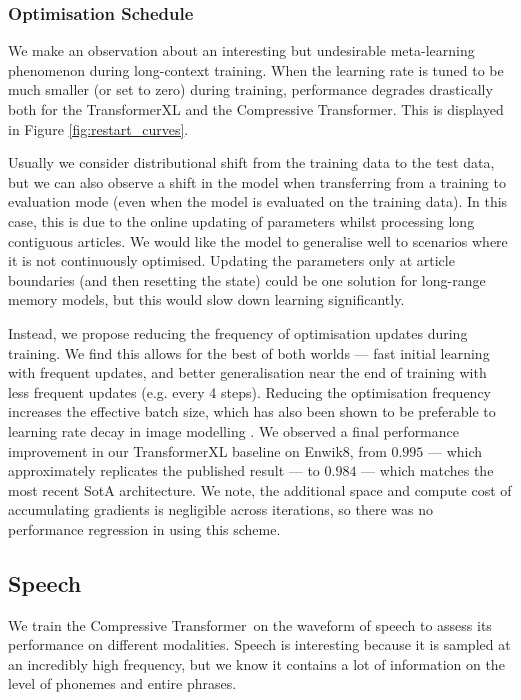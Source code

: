 \subsubsection{Optimisation Schedule}
\label{section:optimisation}
We make an observation about an interesting but undesirable meta-learning phenomenon during long-context training. When the learning rate is tuned to be much smaller (or set to zero) during training, performance degrades drastically both for the TransformerXL and the Compressive Transformer. This is displayed in Figure \ref{fig:restart_curves}.  

Usually we consider distributional shift from the training data to the test data, but we can also observe a shift in the model when transferring from a training to evaluation mode (even when the model is evaluated on the training data). In this case, this is due to the online updating of parameters whilst processing long contiguous articles. We would like the model to generalise well to scenarios where it is not continuously optimised. Updating the parameters only at article boundaries (and then resetting the state) could be one solution for long-range memory models, but this would slow down learning significantly. 

Instead, we propose reducing the frequency of optimisation updates during training. We find this allows for the best of both worlds --- fast initial learning with frequent updates, and better generalisation near the end of training with less frequent updates (e.g. every 4 steps). Reducing the optimisation frequency increases the effective batch size, which has also been shown to be preferable to learning rate decay in image modelling \citep{smithdecay2018}. We observed a final performance improvement in our TransformerXL baseline on Enwik8, from $0.995$ --- which approximately replicates the published result --- to $0.984$ --- which matches the most recent SotA architecture. We note, the additional space and compute cost of accumulating gradients is negligible across iterations, so there was no performance regression in using this scheme.
\subsection{Speech}
We train the Compressive Transformer~on the waveform of speech to assess its performance on different modalities. Speech is interesting because it is sampled at an incredibly high frequency, but we know it contains a lot of information on the level of phonemes and entire phrases.

